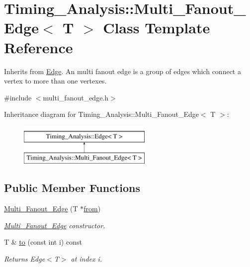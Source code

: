 \hypertarget{classTiming__Analysis_1_1Multi__Fanout__Edge}{\section{Timing\-\_\-\-Analysis\-:\-:Multi\-\_\-\-Fanout\-\_\-\-Edge$<$ T $>$ Class Template Reference}
\label{classTiming__Analysis_1_1Multi__Fanout__Edge}
}


Inherits from \hyperlink{classTiming__Analysis_1_1Edge}{Edge}. An multi fanout edge is a group of edges which connect a vertex to more than one vertexes.  




{\ttfamily \#include $<$multi\-\_\-fanout\-\_\-edge.\-h$>$}

Inheritance diagram for Timing\-\_\-\-Analysis\-:\-:Multi\-\_\-\-Fanout\-\_\-\-Edge$<$ T $>$\-:\begin{figure}[H]
\begin{center}
\leavevmode
\includegraphics[height=2.000000cm]{classTiming__Analysis_1_1Multi__Fanout__Edge}
\end{center}
\end{figure}
\subsection*{Public Member Functions}
\begin{DoxyCompactItemize}
\item 
\hyperlink{classTiming__Analysis_1_1Multi__Fanout__Edge_a877f7672fb4fbabf49943fd3c86b7f59}{Multi\-\_\-\-Fanout\-\_\-\-Edge} (T $\ast$\hyperlink{classTiming__Analysis_1_1Edge_a47020ea89fd9fde438adc814a731a23d}{from})
\begin{DoxyCompactList}\small\item\em \hyperlink{classTiming__Analysis_1_1Multi__Fanout__Edge}{Multi\-\_\-\-Fanout\-\_\-\-Edge} constructor. \end{DoxyCompactList}\item 
T \& \hyperlink{classTiming__Analysis_1_1Multi__Fanout__Edge_a77ac79088e9ef11d222e777e2963f676}{to} (const int i) const 
\begin{DoxyCompactList}\small\item\em Returns Edge$<$\-T$>$ at index i. \end{DoxyCompactList}\end{DoxyCompactItemize}
